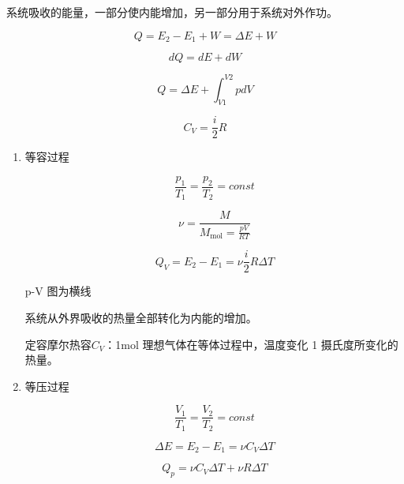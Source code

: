 系统吸收的能量，一部分使内能增加，另一部分用于系统对外作功。

\begin{equation}
    Q=E_2-E_1+W=\Delta{}E+W
\end{equation}

\begin{equation}
    dQ=dE+dW
\end{equation}

\begin{equation}
    Q=\Delta{E}+\int_{V1}^{V2}{pdV}
\end{equation}

\begin{equation}
    C_V=\frac{i}{2}R
\end{equation}

\begin{enumerate}

    \item 等容过程

          \begin{equation}
              \frac{p_1}{T_1}=\frac{p_2}{T_2}=\mathit{const}
          \end{equation}

          \begin{equation}
              \nu{}=\frac{M}{M_\mathrm{mol}=\frac{pV}{RT}}
          \end{equation}

          \begin{equation}
              Q_V=E_2-E_1=\nu{}\frac{i}{2}R\Delta{T}
          \end{equation}

          p-V 图为横线

          系统从外界吸收的热量全部转化为内能的增加。

          定容摩尔热容$C_V$：1mol 理想气体在等体过程中，温度变化 1 摄氏度所变化的热量。

    \item 等压过程

          \begin{equation}
              \frac{V_1}{T_1}=\frac{V_2}{T_2}=\mathit{const}
          \end{equation}


          \begin{equation}
              \Delta{}E=E_2-E_1=\nu{}C_V\Delta{T}
          \end{equation}

          \begin{equation}
              Q_p=\nu{}C_V\Delta{T}+\nu{}R\Delta{T}
          \end{equation}


\end{enumerate}
